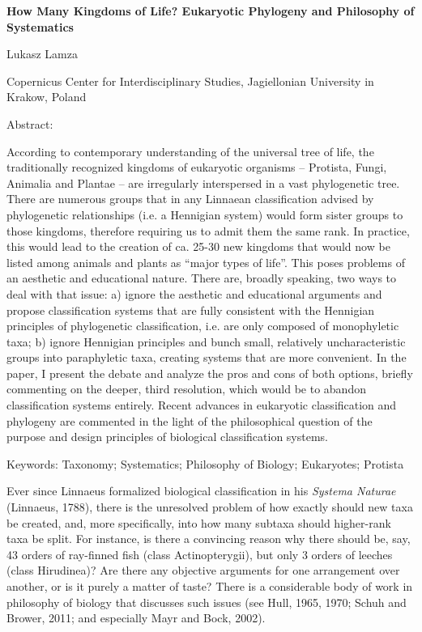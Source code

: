 \documentclass[a4paper]{article}
\title{}
\begin{document}
{\bfseries
How Many Kingdoms of Life? Eukaryotic Phylogeny and Philosophy of Systematics}

Lukasz Lamza

Copernicus Center for Interdisciplinary Studies, Jagiellonian University in Krakow, Poland

Abstract:

According to contemporary understanding of the universal tree of life, the traditionally recognized kingdoms of
eukaryotic organisms – Protista, Fungi, Animalia and Plantae – are irregularly interspersed in a vast phylogenetic
tree. There are numerous groups that in any Linnaean classification advised by phylogenetic relationships (i.e. a
Hennigian system) would form sister groups to those kingdoms, therefore requiring us to admit them the same rank. In
practice, this would lead to the creation of ca. 25-30 new kingdoms that would now be listed among animals and plants
as “major types of life”. This poses problems of an aesthetic and educational nature. There are, broadly speaking, two
ways to deal with that issue: a) ignore the aesthetic and educational arguments and propose classification systems that
are fully consistent with the Hennigian principles of phylogenetic classification, i.e. are only composed of
monophyletic taxa; b) ignore Hennigian principles and bunch small, relatively uncharacteristic groups into paraphyletic
taxa, creating systems that are more convenient. In the paper, I present the debate and analyze the pros and cons of
both options, briefly commenting on the deeper, third resolution, which would be to abandon classification systems
entirely. Recent advances in eukaryotic classification and phylogeny are commented in the light of the philosophical
question of the purpose and design principles of biological classification systems.

Keywords: Taxonomy; Systematics; Philosophy of Biology; Eukaryotes; Protista

Ever since Linnaeus formalized biological classification in his \textit{Systema Naturae}
\label{ref:RNDRPHrvYOnL2}(Linnaeus, 1788), there is the unresolved problem of how exactly should new taxa be created,
and, more specifically, into how many subtaxa should higher-rank taxa be split. For instance, is there a convincing
reason why there should be, say, 43 orders of ray-finned fish (class Actinopterygii), but only 3 orders of leeches
(class Hirudinea)? Are there any objective arguments for one arrangement over another, or is it purely a matter of
taste? There is a considerable body of work in philosophy of biology that discusses such issues
\label{ref:RNDfhQVj97gMS}(see Hull, 1965, 1970; Schuh and Brower, 2011; and especially Mayr and Bock, 2002).
\end{document}
